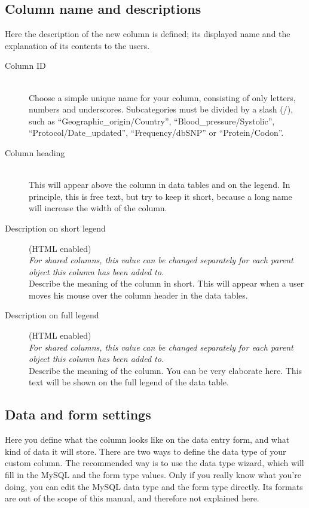 \documentclass[a4paper,oneside,openany,12pt]{memoir}
\begin{document}
\subsection{Column name and descriptions}
Here the description of the new column is defined; its displayed name and the explanation of its contents to the users.
\begin{description}
  \item[Column ID] \hfill \\
  Choose a simple unique name for your column, consisting of only letters, numbers and underscores.
  Subcategories must be divided by a slash (/), such as ``Geographic\_origin\slash Country'', ``Blood\_pressure/Systolic'', ``Protocol/Date\_updated'', ``Frequency/dbSNP'' or ``Protein/Codon''.
  \item[Column heading] \hfill \\
  This will appear above the column in data tables and on the legend.
  In principle, this is free text, but try to keep it short, because a long name will increase the width of the column.
  \item[Description on short legend] (HTML enabled)\hfill \\
  \emph{For shared columns, this value can be changed separately for each parent object this column has been added to.}
  \\
  Describe the meaning of the column in short.
  This will appear when a user moves his mouse over the column header in the data tables.
  \item[Description on full legend] (HTML enabled)\hfill \\
  \emph{For shared columns, this value can be changed separately for each parent object this column has been added to.}
  \\
  Describe the meaning of the column.
  You can be very elaborate here.
  This text will be shown on the full legend of the data table.
\end{description}



\subsection{Data and form settings}
Here you define what the column looks like on the data entry form, and what kind of data it will store.
There are two ways to define the data type of your custom column.
The recommended way is to use the data type wizard, which will fill in the MySQL and the form type values.
Only if you really know what you're doing, you can edit the MySQL data type and the form type directly.
Its formats are out of the scope of this manual, and therefore not explained here.
\end{document}
